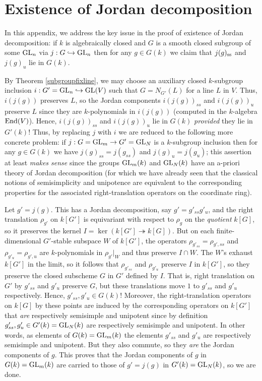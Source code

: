 \documentclass[10pt]{article}
\renewcommand{\(}{\left(}
\renewcommand{\)}{\right)}
\numberwithin{thm}{subsection}
\begin{document}
\section{Existence of Jordan decomposition}\label{jexist}

\medskip\noindent
In this appendix, we address the key issue in the proof of existence of Jordan decomposition:  if $k$ is algebraically closed and $G$ is a smooth
closed subgroup of some ${\rm{GL}}_n$ via $j:G \hookrightarrow {\rm{GL}}_n$ then for any $g \in G(k)$ we claim that
$j(g)_{\rm{ss}}$ and $j(g)_u$ lie in $G(k)$.

By Theorem \ref{subgroupfixline}, 
we may choose an auxiliary closed $k$-subgroup inclusion $i:G' = {\rm{GL}}_n \hookrightarrow {\rm{GL}}(V)$
such that $G = N_{G'}(L)$ for a line $L$ in $V$. Thus, $i(j(g))$ preserves $L$, so the Jordan components $i(j(g))_{ss}$ and $i(j(g))_u$ preserve
$L$ since they are $k$-polynomials in $i(j(g))$ (computed in the $k$-algebra ${\rm{End}}(V)$).  Hence, $i(j(g))_{ss}$ and $i(j(g))_u$ lie
in $G(k)$ {\em provided} they lie in $G'(k)$!  Thus, by replacing $j$ with $i$ we are reduced to the following more concrete problem:
if $j:G = {\rm{GL}}_m \rightarrow G' = {\rm{GL}}_N$ is a $k$-subgroup inclusion then for any $g \in G(k)$ we have $j(g)_{ss} = j(g_{ss})$
and $j(g)_u = j(g_u)$; this assertion at least {\em makes sense} since the groups ${\rm{GL}}_m(k)$ and ${\rm{GL}}_N(k)$ have an a-priori theory
of Jordan decomposition (for which we have already seen that the classical notions of semisimplicity and unipotence are equivalent to the corresponding
properties for the associated right-translation operators on the coordinate ring).   

Let $g' = j(g)$.  This has a Jordan decomposition, say $g' = g'_{ss} g'_u$,
and the right translation $\rho_{g'}$ on $k[G']$ is equivariant with respect to $\rho_g$ on the {\em quotient} $k[G]$, so it
preserves the kernel $I = \ker(k[G'] \twoheadrightarrow k[G])$.  But on each finite-dimensional $G'$-stable subspace $W$
of $k[G']$, the operators $\rho_{g'_{ss}} = \rho_{g', ss}$ and $\rho_{g'_u} = \rho_{g',u}$ are $k$-polynomials in $\rho_{g'}|_W$
and thus preserve $I \cap W$.  The $W$'s exhaust $k[G']$ in the limit, so it follows that $\rho_{g'_{ss}}$ and $\rho_{g'_u}$ preserve
$I$ in $k[G']$, so they preserve the closed subscheme $G$ in $G'$ defined by $I$.  That is, right translation on
$G'$ by $g'_{ss}$ and $g'_u$ preserve $G$, but these translations move $1$ to $g'_{ss}$ and $g'_u$ respectively.
Hence, $g'_{ss}, g'_u \in G(k)$!  Moreover, the right-translation operators on $k[G]$ by these points are induced
by the corresponding operators on $k[G']$ that {\em are} respectively semisimple and unipotent since
by definition $g'_{ss}, g'_u \in G'(k) = {\rm{GL}}_N(k)$ are respectively semisimple and unipotent.  In other
words, as elements of $G(k) = {\rm{GL}}_m(k)$ the elements $g'_{ss}$ and $g'_u$ are respectively semisimple and unipotent.
But they also commute, so they {\em are} the Jordan components of $g$.  This proves that the Jordan components of $g$ in
$G(k) = {\rm{GL}}_m(k)$ are carried to those of $g' = j(g)$ in $G'(k) = {\rm{GL}}_N(k)$, so we are done. 
\end{document}
